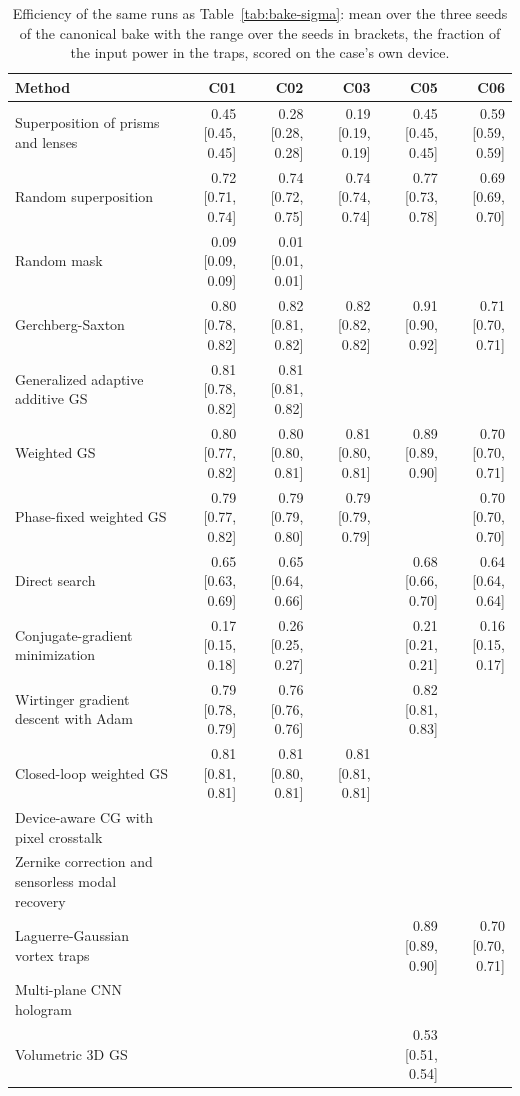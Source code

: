 \begingroup\scriptsize\setlength{\tabcolsep}{2pt}
\begin{longtable}{@{}>{\raggedright\arraybackslash}p{} rrrrr@{}}
\caption{Efficiency of the same runs as Table~\ref{tab:bake-sigma}: mean over the three seeds of the canonical bake with the range over the seeds in brackets, the fraction of the input power in the traps, scored on the case's own device.}\label{tab:bake-eff}\\
\toprule Method & C01 & C02 & C03 & C05 & C06\\
\midrule
Superposition of prisms and lenses & 0.45 [0.45, 0.45] & 0.28 [0.28, 0.28] & 0.19 [0.19, 0.19] & 0.45 [0.45, 0.45] & 0.59 [0.59, 0.59]\\
Random superposition & 0.72 [0.71, 0.74] & 0.74 [0.72, 0.75] & 0.74 [0.74, 0.74] & 0.77 [0.73, 0.78] & 0.69 [0.69, 0.70]\\
Random mask & 0.09 [0.09, 0.09] & 0.01 [0.01, 0.01] &  &  & \\
Gerchberg-Saxton & 0.80 [0.78, 0.82] & 0.82 [0.81, 0.82] & 0.82 [0.82, 0.82] & 0.91 [0.90, 0.92] & 0.71 [0.70, 0.71]\\
Generalized adaptive additive GS & 0.81 [0.78, 0.82] & 0.81 [0.81, 0.82] &  &  & \\
Weighted GS & 0.80 [0.77, 0.82] & 0.80 [0.80, 0.81] & 0.81 [0.80, 0.81] & 0.89 [0.89, 0.90] & 0.70 [0.70, 0.71]\\
Phase-fixed weighted GS & 0.79 [0.77, 0.82] & 0.79 [0.79, 0.80] & 0.79 [0.79, 0.79] &  & 0.70 [0.70, 0.70]\\
Direct search & 0.65 [0.63, 0.69] & 0.65 [0.64, 0.66] &  & 0.68 [0.66, 0.70] & 0.64 [0.64, 0.64]\\
Conjugate-gradient minimization & 0.17 [0.15, 0.18] & 0.26 [0.25, 0.27] &  & 0.21 [0.21, 0.21] & 0.16 [0.15, 0.17]\\
Wirtinger gradient descent with Adam & 0.79 [0.78, 0.79] & 0.76 [0.76, 0.76] &  & 0.82 [0.81, 0.83] & \\
Closed-loop weighted GS & 0.81 [0.81, 0.81] & 0.81 [0.80, 0.81] & 0.81 [0.81, 0.81] &  & \\
Device-aware CG with pixel crosstalk &  &  &  &  & \\
Zernike correction and sensorless modal recovery &  &  &  &  & \\
Laguerre-Gaussian vortex traps &  &  &  & 0.89 [0.89, 0.90] & 0.70 [0.70, 0.71]\\
Multi-plane CNN hologram &  &  &  &  & \\
Volumetric 3D GS &  &  &  & 0.53 [0.51, 0.54] & \\

\end{longtable}

